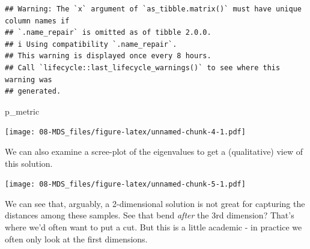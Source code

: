 \documentclass[
]{book}
\newenvironment{Shaded}{\begin{snugshade}}{\end{snugshade}}
\newcommand{\AttributeTok}[1]{\textcolor[rgb]{0.13,0.29,0.53}{#1}}
\newcommand{\ConstantTok}[1]{\textcolor[rgb]{0.56,0.35,0.01}{#1}}
\newcommand{\DecValTok}[1]{\textcolor[rgb]{0.00,0.00,0.81}{#1}}
\newcommand{\FunctionTok}[1]{\textcolor[rgb]{0.13,0.29,0.53}{\textbf{#1}}}
\newcommand{\NormalTok}[1]{#1}
\newcommand{\SpecialCharTok}[1]{\textcolor[rgb]{0.81,0.36,0.00}{\textbf{#1}}}
\newcommand{\StringTok}[1]{\textcolor[rgb]{0.31,0.60,0.02}{#1}}
\begin{document}
\begin{verbatim}
## Warning: The `x` argument of `as_tibble.matrix()` must have unique column names if
## `.name_repair` is omitted as of tibble 2.0.0.
## i Using compatibility `.name_repair`.
## This warning is displayed once every 8 hours.
## Call `lifecycle::last_lifecycle_warnings()` to see where this warning was
## generated.
\end{verbatim}

\begin{Shaded}
\begin{Highlighting}[]
\NormalTok{p\_metric}
\end{Highlighting}
\end{Shaded}

\texttt{[image: 08-MDS\_files/figure-latex/unnamed-chunk-4-1.pdf]}

We can also examine a scree-plot of the eigenvalues to get a (qualitative) view of this solution.

\begin{Shaded}
\end{Shaded}

\texttt{[image: 08-MDS\_files/figure-latex/unnamed-chunk-5-1.pdf]}

We can see that, arguably, a 2-dimensional solution is not great for capturing the distances among these samples. See that bend \emph{after} the 3rd dimension? That's where we'd often want to put a cut. But this is a little academic - in practice we often only look at the first dimensions.
\end{document}

